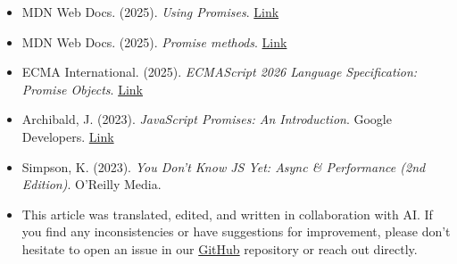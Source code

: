 \documentclass[12pt,letterpaper]{article}
\begin{document}
\begin{itemize}
    \item MDN Web Docs. (2025). \textit{Using Promises}. \href{https://developer.mozilla.org/en-US/docs/Web/JavaScript/Guide/Using_promises}{Link}
    
    \item MDN Web Docs. (2025). \textit{Promise methods}. \href{https://developer.mozilla.org/en-US/docs/Web/JavaScript/Reference/Global_Objects/Promise#Static_methods}{Link}
    
    \item ECMA International. (2025). \textit{ECMAScript 2026 Language Specification: Promise Objects}. \href{https://tc39.es/ecma262/multipage/control-abstraction-objects.html#sec-promise-objects}{Link}
    
    \item Archibald, J. (2023). \textit{JavaScript Promises: An Introduction}. Google Developers. \href{https://web.dev/articles/promises}{Link}
    
    \item Simpson, K. (2023). \textit{You Don't Know JS Yet: Async \& Performance (2nd Edition)}. O'Reilly Media.

    \item This article was translated, edited, and written in collaboration with AI. If you find any inconsistencies or have suggestions for improvement, please don't hesitate to open an issue in our \href{https://github.com/asanchezyali/social-media-posts}{GitHub} repository or reach out directly.
\end{itemize}
\end{document}
